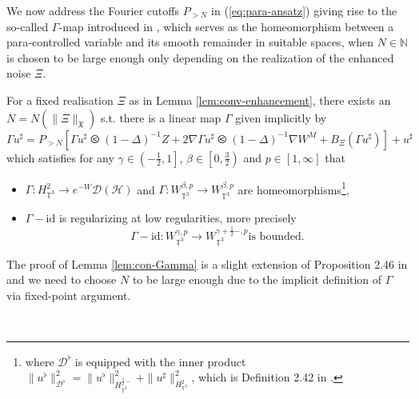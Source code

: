 We now address the Fourier cutoffs $P_{> N}$ in (\ref{eq:para-ansatz}) giving
rise to the so-called $\Gamma$-map introduced in {\cite{GUZ20}},
which serves as the homeomorphism between a para-controlled variable and its
smooth remainder in suitable spaces, when $N \in \mathbb{N}$ is chosen to be
large enough only depending on the realization of the enhanced noise
$\Xi$.

\begin{lem}
  \label{lem:con-Gamma}For a fixed realisation $\Xi$ as in Lemma
  \ref{lem:conv-enhancement}, there exists an $N = N (\| \Xi
  \|_{\mathfrak{X}})$ s.t. there is a linear map $\Gamma$ given implicitly by
  \[ \Gamma u^{\sharp} = P_{> N} [\Gamma u^{\sharp} \olessthan (1 - \Delta)^{-
     1} Z + 2 \nabla \Gamma u^{\sharp} \olessthan (1 - \Delta)^{- 1} \nabla
     W^M + B_{\Xi} (\Gamma u^{\sharp})] + u^{\sharp} \]
  which satisfies for any $\gamma \in \left( - \frac{1}{2}, 1 \right]$, $\beta
  \in \left[0, \frac{3}{2}\right)$ and $p \in [1, \infty]$ that
  \begin{itemize}
    \item $\Gamma: H_{\mathbb{T}^3}^2 \to e^{- W}
    \mathcal{D} (\mathcal{H})$ and $\Gamma: W^{\beta, p}_{\mathbb{T}^3}\to W^{\beta, p}_{\mathbb{T}^3}$ are homeomorphisms\footnote{where $\mathcal{D}^{\flat}$ is equipped with the inner product $ \|u^{\flat} \|^2_{\mathcal{D}^{\flat}} = \| u^{\flat}
    \|^2_{H_{\mathbb{T}^3}^{\frac{3}{2} -}} + \| u^{\sharp}
    \|_{H_{\mathbb{T}^3}^2}^2$,
    which is Definition 2.42 in {\cite{GUZ20}}.},
    
    \item $\Gamma - \mathrm{id}$ is regularizing at low regularities, more
    precisely
    \begin{equation}
      \Gamma - \mathrm{id} : W^{\gamma, p}_{\mathbb{T}^3} \rightarrow W^{\gamma
      + \frac{1}{2} -, p}_{\mathbb{T}^3}  \text{is bounded} .
      \label{eq:cont-G-id}
    \end{equation}
  \end{itemize}
\end{lem}

The proof of Lemma \ref{lem:con-Gamma} is a slight extension of Proposition
2.46 in {\cite{GUZ20}} and we need to choose $N$ to be large enough due to the
implicit definition of $\Gamma$ via fixed-point argument.

\

